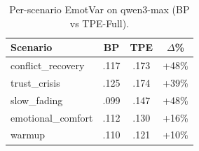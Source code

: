 \begin{table}[t]
\centering
\small
\begin{tabular}{lccc}
\toprule
\textbf{Scenario} & \textbf{BP} & \textbf{TPE} & \textbf{$\Delta$\%} \\
\midrule
conflict\_recovery & .117 & .173 & +48\% \\
trust\_crisis & .125 & .174 & +39\% \\
slow\_fading & .099 & .147 & +48\% \\
emotional\_comfort & .112 & .130 & +16\% \\
warmup & .110 & .121 & +10\% \\
\bottomrule
\end{tabular}
\caption{Per-scenario EmotVar on qwen3-max (BP vs TPE-Full).}
\label{tab:scenario}
\end{table}
